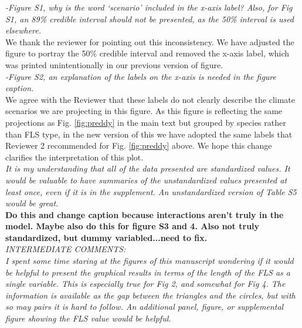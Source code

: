 \documentclass[11pt]{article}
\begin{document}
\emph{-Figure S1, why is the word `scenario' included in the x-axis label? Also, for Fig S1, an 89\% credible interval should not be presented, as the 50\% interval is used elsewhere.}\\

\noident We thank the reviewer for pointing out this inconsistency. We have adjusted the figure to portray the 50\% credible interval and removed the x-axis label, which was printed unintentionally in our previous version of figure.\\

\emph{-Figure S2, an explanation of the labels on the x-axis is needed in the figure caption.}\\

\noindent We agree with the Reviewer that these labels do not clearly describe the climate scenarios we are projecting in this figure. As this figure is reflecting the same projections as Fig. \ref{fig:preddy} in the main text but grouped by species rather than FLS type, in the new version of this we have adopted the same labels that Reviewer 2 recommended for Fig. \ref{fig:preddy} above. We hope this change clarifies the interpretation of this plot.\\


\emph{It is my understanding that all of the data presented are standardized values. It would be valuable to have summaries of the unstandardized values presented at least once, even if it is in the supplement. An unstandardized version of Table S5 would be great.}\\

\textbf{Do this and change caption because interactions aren't truly in the model. Maybe also do this for figure S3 and 4. Also not truly standardized, but dummy variabled...need to fix.}\\ 

\emph{INTERMEDIATE COMMENTS:}\\
\emph{I spent some time staring at the figures of this manuscript wondering if it would be helpful to present the graphical results in terms of the length of the FLS as a single variable. This is especially true for Fig 2, and somewhat for Fig 4. The information is available as the gap between the triangles and the circles, but with so may pairs it is hard to follow. An additional panel, figure, or supplemental figure showing the FLS value would be helpful.}\\
\end{document}
